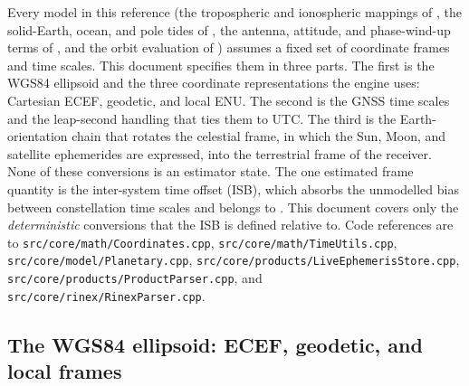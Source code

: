 \documentclass[main.tex]{subfiles}
\begin{document}
Every model in this reference (the tropospheric and ionospheric
mappings of , the
solid-Earth, ocean, and pole tides of , the antenna, attitude, and phase-wind-up terms
of , and the orbit
evaluation of )
assumes a fixed set of coordinate frames and time scales.  This document
specifies them in three parts.  The first is the WGS84 ellipsoid and the
three coordinate representations the engine uses: Cartesian ECEF,
geodetic, and local ENU.  The second is the GNSS time scales and the
leap-second handling that ties them to UTC.  The third is the
Earth-orientation chain that rotates the celestial frame, in which the
Sun, Moon, and satellite ephemerides are expressed, into the terrestrial
frame of the receiver.  None of these conversions is an estimator
state.  The one estimated frame quantity is the inter-system time offset
(ISB), which absorbs the unmodelled bias between constellation time
scales and belongs to .
This document covers only the \emph{deterministic} conversions that the
ISB is defined relative to.  Code references are to \texttt{src/core/math/Coordinates.cpp},
\texttt{src/core/math/TimeUtils.cpp}, \texttt{src/core/model/Planetary.cpp},
\texttt{src/core/products/LiveEphemerisStore.cpp},
\texttt{src/core/products/ProductParser.cpp}, and
\texttt{src/core/rinex/RinexParser.cpp}.

\subsection{The WGS84 ellipsoid: ECEF, geodetic, and local frames}
\label{sec:frame-geodetic}
\end{document}
